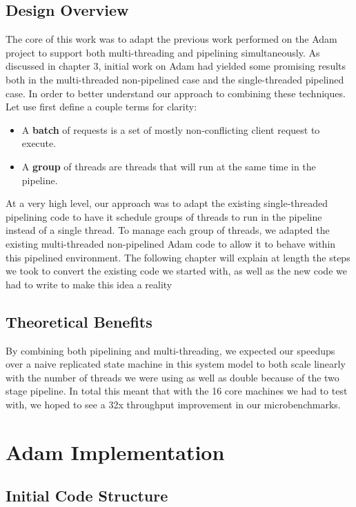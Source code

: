 \documentclass[11pt, oneside]{report}
\begin{document}
\section{Design Overview}

The core of this work was to adapt the previous work performed on the Adam project to support both multi-threading and pipelining simultaneously. As discussed in chapter 3, initial work on Adam had yielded some promising results both in the multi-threaded non-pipelined case and the single-threaded pipelined case. In order to better understand our approach to combining these techniques. Let use first define a couple terms for clarity:
\begin{itemize}
\item A \textbf{batch} of requests is a set of mostly non-conflicting client request to execute.
\item A \textbf{group} of threads are threads that will run at the same time in the pipeline.
\end{itemize}

At a very high level, our approach was to adapt the existing single-threaded pipelining code to have it schedule groups of threads to run in the pipeline instead of a single thread. To manage each group of threads, we adapted the existing multi-threaded non-pipelined Adam code to allow it to behave within this pipelined environment. The following chapter will explain at length the steps we took to convert the existing code we started with, as well as the new code we had to write to make this idea a reality

\section{Theoretical Benefits}

By combining both pipelining and multi-threading, we expected our speedups over a naive replicated state machine in this system model to both scale linearly with the number of threads we were using as well as double because of the two stage pipeline. In total this meant that with the 16 core machines we had to test with, we hoped to see a 32x throughput improvement in our microbenchmarks.

\chapter{Adam Implementation}\label{AdamImplementation}

\section{Initial Code Structure}
\end{document}
